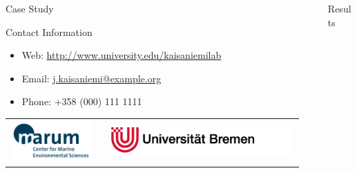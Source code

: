 \documentclass[final]{beamer}
\newlength{\sepwid}
\newlength{\onecolwid}
\newlength{\twocolwid}
\begin{document}
\begin{frame}[t]
\begin{columns}[t]
\begin{column}{\onecolwid}
\begin{block}{Case Study}
\end{block}


\begin{alertblock}{Contact Information}

\begin{itemize}
\item Web: \href{http://www.university.edu/kaisaniemilab}{http://www.university.edu/kaisaniemilab}
\item Email: \href{mailto:j.kaisaniemi@example.org}{j.kaisaniemi@example.org}
\item Phone: +358 (000) 111 1111
\end{itemize}

\end{alertblock}

\begin{center}
  \begin{tabular}{ccc}
  \includegraphics[width=0.4\linewidth]{marum.png} & \hfill &  \includegraphics[width=0.4\linewidth]{unihb.png}
  \end{tabular}
\end{center}

\end{column}

\begin{column}{\sepwid}\end{column}
\begin{column}{\twocolwid}
\begin{block}{Results}


\end{block}
\end{column}
\end{columns}
\end{frame}
\end{document}
